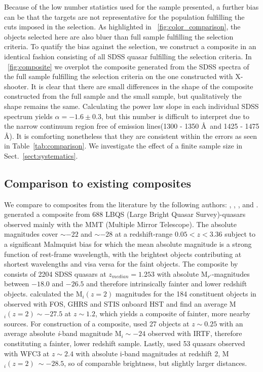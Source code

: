 \documentclass{aa}    %
\newcommand{\figref}[1]{\ref{fig:#1}}
\newcommand{\Fig}[1]{\figurename~\figref{#1}}
\newcommand{\fig}[1]{\Fig{#1}}
\newcommand{\Tab}[1]{Table~\ref{tab:#1}}
\newcommand{\tab}[1]{\Tab{#1}}
\newcommand{\sectionname}{Sect.}
\newcommand{\Sect}[1]{\sectionname~\ref{sect:#1}}
\newcommand{\sect}[1]{\Sect{#1}}
\newcommand{\sectlabel}[1]{\label{sect:#1}}
\begin{document}
Because of the low number statistics used for the sample presented, a further bias can be that the targets are not representative for the population fulfilling the cuts imposed in the selection. As highlighted in \fig{color_comparison}, the objects selected here are also bluer than full sample fulfilling the selection criteria. To quatify the bias against the selection, we construct a composite in an identical fashion consisting of all SDSS quasar fulfilling the selection criteria. 
In \fig{composite} we overplot the composite generated from the SDSS spectra of the full sample fulfilling the selection criteria on the one constructed with X-shooter. It is clear that there are small differences in the shape of the composite constructed from the full sample and the small sample, but qualitatively the shape remains the same. Calculating the power law slope in each individual SDSS spectrum yields $\alpha = -1.6\pm 0.3$, but this number is difficult to interpret due to the narrow continuum region free of emission lines(1300 - 1350 \AA~and 1425 - 1475 \AA). It is comforting nonetheless that they are consistent within the errors as seen in \tab{comparison}. We investigate the effect of a finite sample size in \sect{systematics}.


\subsection{Comparison to existing composites} \sectlabel{comparison}

We compare to composites from the literature by the following authors: \citet{Francis1991}, \citet{VandenBerk2001}, \citet{Telfer2002}, \citet{Glikman2006} and \citet{Lusso2015}. \citet{Francis1991} generated a composite from 688 LBQS (Large Bright Quasar Survey)-quasars observed mainly with the MMT (Multiple Mirror Telescope). The absolute magnitudes cover $\sim -22$ and $\sim -28$ at a redshift-range $0.05 < z  < 3.36$ subject to a significant Malmquist bias for which the mean absolute magnitude is a strong function of rest-frame wavelength, with the brightest objects contributing at shortest wavelengths and visa versa for the faint objects. The composite by \citet{VandenBerk2001} consists of 2204 SDSS quasars at $z_{median} = 1.253$ with absolute M$_{r'}$-magnitudes between $-18.0$ and $-26.5$ and therefore intrinsically fainter and lower redshift objects. \citet{Lusso2015} calculated the M$_i(z=2)$ magnitudes for the 184 constituent objects in \citet{Telfer2002} observed with FOS, GHRS and STIS onboard HST and find an average M$_i(z=2) \sim -27.5$ at $z \sim 1.2$, which yields a composite of fainter, more nearby sources. For construction of a composite, \citet{Glikman2006}  used 27 objects at $z \sim 0.25$ with an average absolute \textit{i}-band magnitude M$_i \sim -24$ observed with IRTF, therefore constituting a fainter, lower redshift sample. Lastly, \citet{Lusso2015} used 53 quasars observed with WFC3 at $z \sim 2.4$ with absolute i-band magnitudes at redshift 2, M$_i(z=2) ~\sim -28.5$, so of comparable brightness, but slightly larger distances.
\end{document}
